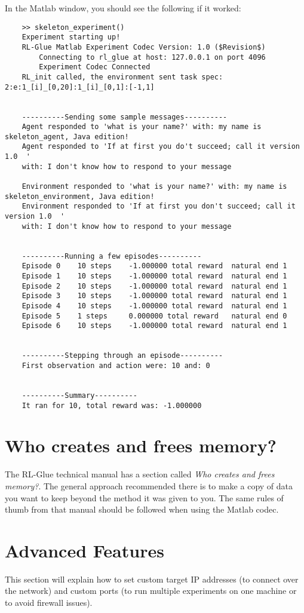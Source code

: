 \documentclass[11pt]{article}
\begin{document}
In the Matlab window, you should see the following if it worked:
\begin{verbatim}
	>> skeleton_experiment()
	Experiment starting up!
	RL-Glue Matlab Experiment Codec Version: 1.0 ($Revision$)
	    Connecting to rl_glue at host: 127.0.0.1 on port 4096
	    Experiment Codec Connected
	RL_init called, the environment sent task spec: 2:e:1_[i]_[0,20]:1_[i]_[0,1]:[-1,1]


	----------Sending some sample messages----------
	Agent responded to 'what is your name?' with: my name is skeleton_agent, Java edition!
	Agent responded to 'If at first you do't succeed; call it version 1.0  ' 
	with: I don't know how to respond to your message

	Environment responded to 'what is your name?' with: my name is skeleton_environment, Java edition!
	Environment responded to 'If at first you don't succeed; call it version 1.0  ' 
	with: I don't know how to respond to your message


	----------Running a few episodes----------
	Episode 0	 10 steps 	 -1.000000 total reward	 natural end 1
	Episode 1	 10 steps 	 -1.000000 total reward	 natural end 1
	Episode 2	 10 steps 	 -1.000000 total reward	 natural end 1
	Episode 3	 10 steps 	 -1.000000 total reward	 natural end 1
	Episode 4	 10 steps 	 -1.000000 total reward	 natural end 1
	Episode 5	 1 steps 	 0.000000 total reward	 natural end 0
	Episode 6	 10 steps 	 -1.000000 total reward	 natural end 1


	----------Stepping through an episode----------
	First observation and action were: 10 and: 0


	----------Summary----------
	It ran for 10, total reward was: -1.000000
\end{verbatim}


\section{Who creates and frees memory?}
The RL-Glue technical manual has a section called \textit{Who creates and frees memory?}.  The general approach recommended there is to make a copy of data
you want to keep beyond the method it was given to you.  The same rules of thumb from that manual should be followed when using the Matlab codec.


\section{Advanced Features}
This section will explain how to set custom target IP addresses (to connect over the network) and custom ports (to run multiple experiments on one machine or to avoid firewall issues).
\end{document}

